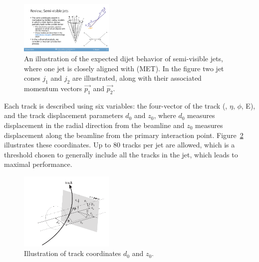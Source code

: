 \begin{figure}[!htbp]
\centering
   \includegraphics[width=0.4\textwidth]{figures/ml/dijet_topology}
    \caption{An illustration of the expected dijet behavior of semi-visible jets, where one jet is closely aligned with \met (MET). In the figure two jet cones $j_1$ and $j_2$ are illustrated, along with their associated momentum vectors $\vec{p_1}$ and $\vec{p_2}$. 
        \label{fig:svj_pic}}
\end{figure}

Each track is described using six variables: the four-vector of the track (\pt, $\eta$, $\phi$, E), and the track displacement parameters $d_0$ and $z_0$, where $d_0$ measures displacement in the radial direction from the beamline and $z_0$ measures displacement along the beamline from the primary interaction point. Figure~\ref{fig:trackcoordinates} illustrates these coordinates. Up to 80 tracks per jet are allowed, which is a threshold chosen to generally include all the tracks in the jet, which leads to maximal performance.\par %

\begin{figure}[!htbp]
\centering
   \includegraphics[width=0.4\textwidth]{figures/ml/trackcoordinates}
    \caption{Illustration of track coordinates $d_0$ and $z_0$.
    \label{fig:trackcoordinates}}
\end{figure}


